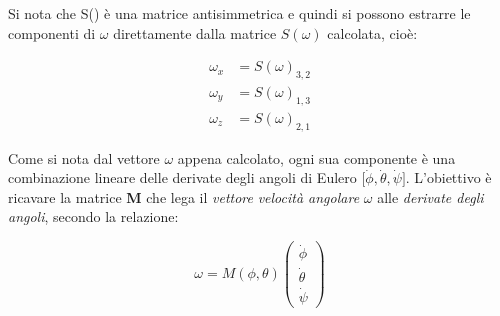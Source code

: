 \documentclass[11pt, a4paper]{article}
\begin{document}
\begin{par}
\begin{flushleft}
Si nota che S(\omega) è una matrice antisimmetrica e quindi si possono estrarre le componenti di $\omega$ direttamente dalla matrice $S(\omega )$ calcolata, cioè:
\end{flushleft}
\end{par}

\[
\begin{aligned}
    \omega_x &= S(\omega)_{3,2} \\
    \omega_y &= S(\omega)_{1,3} \\
    \omega_z &= S(\omega)_{2,1}
\end{aligned}
\]

\begin{par}
\begin{flushleft}
Come si nota dal vettore $\omega$ appena calcolato, ogni sua componente è una combinazione lineare delle derivate degli angoli di Eulero $\bigl\lbrack \dot{\phi} ,\dot{\theta} ,\dot{\psi} \bigr\rbrack$. L'obiettivo è ricavare la matrice \textbf{M} che lega il \textit{vettore} \textit{velocità angolare }$\omega$ alle \textit{derivate degli angoli}, secondo la relazione:
\end{flushleft}
\end{par}

\[
    \omega = M(\phi ,\theta ) \left(\begin{array}{c}
    \dot{\phi} \\
    \dot{\theta} \\
    \dot{\psi}
    \end{array}\right)
\]


\vspace{1em}

\end{document}
